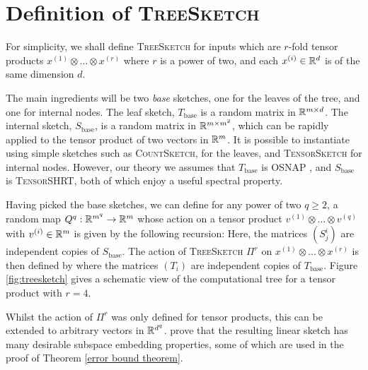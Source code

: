\section{Definition of \textsc{TreeSketch}}
\label{apdx:ahle-sketch}

For simplicity, we shall define \textsc{TreeSketch} \citep{ahle2020oblivious} for inputs which are $r$-fold tensor products $x^{(1)}\otimes\dots\otimes x^{(r)}$ where $r$ is a power of two, and each $x^{(i)}\in\mathbb{R}^d$ is of the same dimension $d$.

The main ingredients will be two \emph{base} sketches, one for the leaves of the tree, and one for internal nodes. The leaf sketch, $T_\text{base}$ is a random matrix in $\mathbb{R}^{m\times d}$. The internal sketch, $S_\text{base}$, is a random matrix in $\mathbb{R}^{m\times m^2}$, which can be rapidly applied to the tensor product of two vectors in $\mathbb{R}^m$. It is possible to instantiate  using simple sketches such as \textsc{CountSketch}, for the leaves, and \textsc{TensorSketch} for internal nodes. However, our theory we assumes that $T_\text{base}$ is \textsc{OSNAP} \citep{nelson2013osnap}, and $S_\text{base}$ is \textsc{TensorSHRT}, both of which enjoy a useful spectral property. 

Having picked the base sketches, we can define for any power of two $q\ge 2$, a random map $Q^q: \mathbb{R}^{m^q} \to \mathbb{R}^m$ whose action on a tensor product $v^{(1)}\otimes \dots\otimes v^{(q)}$ with $v^{(i)}\in\mathbb{R}^m$ is given by the following recursion:
Here, the matrices $(S^i_j)$ are independent copies of $S_\text{base}$. The action of \textsc{TreeSketch} $\Pi^r$ on $x^{(1)}\otimes\dots\otimes x^{(r)}$ is then defined by
where the matrices $(T_i)$ are independent copies of $T_\text{base}$. Figure \ref{fig:treesketch} gives a schematic view of the computational tree for a tensor product with $r=4$. 

Whilst the action of $\Pi^r$ was only defined for tensor products, this can be extended to arbitrary vectors in $\mathbb{R}^{d^q}$. \citet{ahle2020oblivious} prove that the resulting linear sketch has many desirable subspace embedding properties, some of which are used in the proof of Theorem \ref{error bound theorem}.

